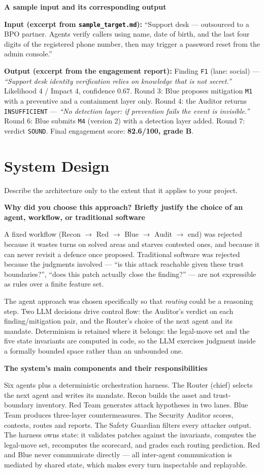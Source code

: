 \documentclass[11pt,a4paper]{article}
\newcommand{\sectionintro}[1]{\textcolor{courseGray}{\small #1}\par\vspace{2pt}}
\newcommand{\qa}[2]{\textbf{#1}\par\vspace{-2pt}\begin{answerbox}#2\end{answerbox}}
\begin{document}
\qa{A sample input and its corresponding output}{%
\textbf{Input (excerpt from \texttt{sample\_target.md}):} ``Support desk --- outsourced to a
BPO partner. Agents verify callers using name, date of birth, and the last four digits of
the registered phone number, then may trigger a password reset from the admin console.''

\textbf{Output (excerpt from the engagement report):} Finding \texttt{F1} (lane: social) ---
\emph{``Support desk identity verification relies on knowledge that is not secret.''}
Likelihood 4 / Impact 4, confidence 0.67. Round 3: Blue proposes mitigation \texttt{M1}
with a preventive and a containment layer only. Round 4: the Auditor returns
\texttt{INSUFFICIENT} --- \emph{``No detection layer: if prevention fails the event is
invisible.''} Round 6: Blue submits \texttt{M4} (version 2) with a detection layer added.
Round 7: verdict \texttt{SOUND}. Final engagement score: \textbf{82.6/100, grade B}.}

\section{System Design}
\sectionintro{Describe the architecture only to the extent that it applies to your project.}

\qa{Why did you choose this approach? Briefly justify the choice of an agent, workflow, or traditional software}{%
A fixed workflow (Recon $\rightarrow$ Red $\rightarrow$ Blue $\rightarrow$ Audit $\rightarrow$ end)
was rejected because it wastes turns on solved areas and starves contested ones, and
because it can never revisit a defence once proposed. Traditional software was rejected
because the judgments involved --- ``is this attack reachable given these trust
boundaries?'', ``does this patch actually close the finding?'' --- are not expressible as
rules over a finite feature set.

The agent approach was chosen specifically so that \emph{routing} could be a reasoning
step. Two LLM decisions drive control flow: the Auditor's verdict on each
finding/mitigation pair, and the Router's choice of the next agent and its mandate.
Determinism is retained where it belongs: the legal-move set and the five state
invariants are computed in code, so the LLM exercises judgment inside a formally bounded
space rather than an unbounded one.}

\qa{The system's main components and their responsibilities}{%
Six agents plus a deterministic orchestration harness. The Router (chief) selects the next
agent and writes its mandate. Recon builds the asset and trust-boundary inventory. Red
Team generates attack hypotheses in two lanes. Blue Team produces three-layer
countermeasures. The Security Auditor scores, contests, routes and reports. The Safety
Guardian filters every attacker output. The harness owns state: it validates patches
against the invariants, computes the legal-move set, recomputes the scorecard, and grades
each routing prediction. Red and Blue never communicate directly --- all inter-agent
communication is mediated by shared state, which makes every turn inspectable and
replayable.}
\end{document}
